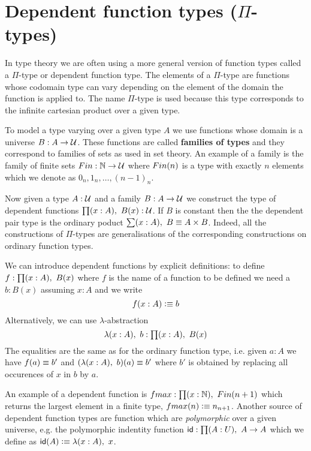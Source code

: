 
\section{Dependent function types (\texorpdfstring{$\Pi$}{Π}-types)}
\label{sec:pi-types}

In type theory we are often using a more general version of function
types called a $\Pi$-type or dependent function type. The elements of
a $\Pi$-type are functions whose codomain type can vary depending on the
element of the domain the function is applied to. The name $\Pi$-type
is used because this type corresponds to the infinite cartesian
product over a given type.

To model a type varying over a given type $A$ we use functions whose
domain is a universe $B : A \to \mathcal{U}$. These functions are called
\textbf{families of types} and they correspond to families of sets as used in
set theory. An example of a family is the family of finite sets $Fin
: \mathbb{N} \to \mathcal{U}$ where $Fin(n)$ is a type with exactly $n$ elements
which we denote as $0_n,1_n,\dots,(n-1)_n$. 

Now given a type $A:\mathcal{U}$ and a family $B:A \to \mathcal{U}$ we construct
the type of dependent functions $\prd{x:A}B(x) : \UU$. If $B$ is
constant then the the dependent pair type is the ordinary poduct
$\sm{x:A} B \jdeq A \times B$. Indeed, all
the constructions of $\Pi$-types are generalisations of the
corresponding constructions on ordinary function types.

We can introduce dependent functions by explicit definitions: to
define $f : \prd{x:A}B(x)$ where $f$ is the name of a function to be
defined we need a $b : B(x)$ assuming $x:A$ and we write
\[ f(x : A) \vcentcolon\equiv b \]
Alternatively, we can use $\lambda$-abstraction 
\[ \lam{x:A} b : \prd{x:A} B(x) \]
The equalities are the same as for the ordinary function type, i.e.
given $a:A$ we have $f(a) \equiv b'$ and  
$(\lam{x:A} b)(a) \jdeq b'$ where $b' $ is obtained by replacing all
occurences of $x$ in $b$ by $a$.

An example of a dependent function is $\fmax : \prd{x:\nat} \Fin(n+1)$
which returns the largest element in a finite type, $fmax(n) \vcentcolon\equiv
n_{n+1}$. 
Another source of dependent function types
are function which are \emph{polymorphic} over a given universe,
e.g. the polymorphic indentity function $\idf : \prd{A:U} A \to A$
which we define as $\idf(A) \defeq \lam{x:A}x$.

